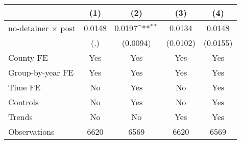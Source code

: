 {
\def\sym#1{\ifmmode^{#1}\else\(^{#1}\)\fi}
\begin{tabular*}{0.7\textwidth}{@{\hskip\tabcolsep\extracolsep\fill}l*{4}{c}}
\hline\hline
                    &\multicolumn{1}{c}{(1)}         &\multicolumn{1}{c}{(2)}         &\multicolumn{1}{c}{(3)}         &\multicolumn{1}{c}{(4)}         \\
\hline
no-detainer $\times$ post&      0.0148         &      0.0197\sym{**} &      0.0134         &      0.0148         \\
                    &         (.)         &    (0.0094)         &    (0.0102)         &    (0.0155)         \\
[1em]
County FE           &         Yes         &         Yes         &         Yes         &         Yes         \\
[1em]
Group-by-year FE    &         Yes         &         Yes         &         Yes         &         Yes         \\
[1em]
Time FE             &          No         &         Yes         &          No         &         Yes         \\
[1em]
Controls            &          No         &         Yes         &          No         &         Yes         \\
[1em]
Trends              &          No         &          No         &         Yes         &         Yes         \\
\hline
Observations        &        6620         &        6569         &        6620         &        6569         \\
\hline\hline
\end{tabular*}
}
